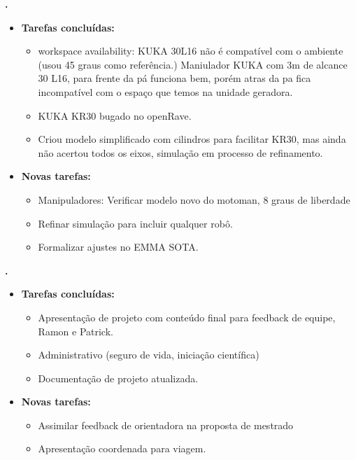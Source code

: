 			
   \textbf{\gabriel.} 
	\begin{itemize}
		\item \textbf{Tarefas concluídas:}
			\begin{itemize}    
				\item workspace availability: KUKA 30L16 não é compatível com o ambiente
				(usou 45 graus como referência.) Maniulador  KUKA com 3m de alcance 30 L16,
				para frente da pá funciona bem, porém atras da pa fica incompatível com o
				espaço que temos na unidade geradora.
				\item KUKA KR30 bugado no openRave.
				\item Criou modelo simplificado com cilindros para facilitar KR30, mas ainda
				não acertou todos os eixos, simulação em processo de refinamento.
			\end{itemize}
		
		\item \textbf{Novas tarefas:}
			\begin{itemize} 
			    \item Manipuladores: Verificar modelo novo do motoman, 8 graus de
			    liberdade
			    \item Refinar simulação para incluir qualquer robô.
				\item Formalizar ajustes no EMMA SOTA.
			\end{itemize}
	\end{itemize}
	
	   \textbf{\julia.} 
	\begin{itemize}
		\item \textbf{Tarefas concluídas:}
			\begin{itemize}    
				\item Apresentação de projeto com conteúdo final para feedback de equipe, 
				Ramon e Patrick.
				\item Administrativo (seguro de vida, iniciação científica)
				\item Documentação de projeto atualizada.
			\end{itemize}
		
		\item \textbf{Novas tarefas:}
			\begin{itemize} 
			    \item Assimilar feedback de orientadora na proposta de mestrado
				\item Apresentação coordenada para viagem.
			\end{itemize}
	\end{itemize}

